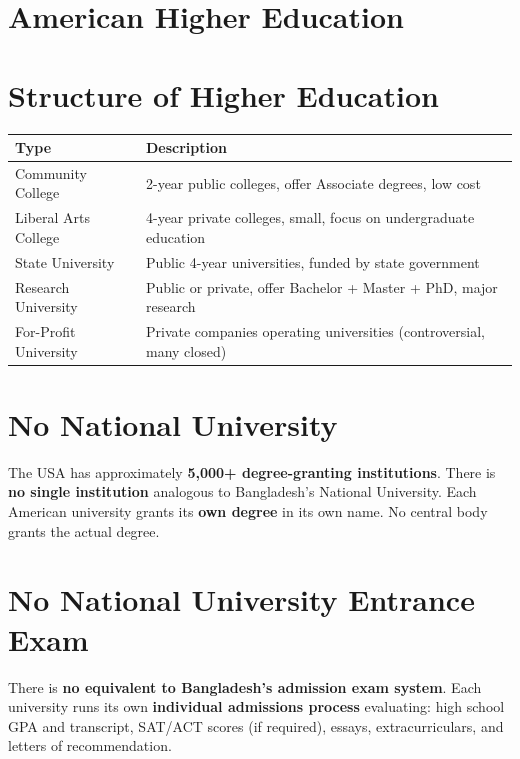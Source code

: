 \section{American Higher Education}

\section{Structure of Higher Education}


\begin{center}\small
	\begin{tabularx}{0.97\textwidth}{@{} >{\raggedright\arraybackslash}p{3.5cm} X @{}}
		\toprule
		\textbf{Type}         & \textbf{Description}                                                  \\
		\midrule
		Community College     & 2-year public colleges, offer Associate degrees, low cost             \\
		Liberal Arts College  & 4-year private colleges, small, focus on undergraduate education      \\
		State University      & Public 4-year universities, funded by state government                \\
		Research University   & Public or private, offer Bachelor + Master + PhD, major research      \\
		For-Profit University & Private companies operating universities (controversial, many closed) \\
		\bottomrule
	\end{tabularx}
\end{center}


\section{No National University}

The USA has approximately \textbf{5,000+ degree-granting institutions}. There is \textbf{no single institution} analogous to Bangladesh's National University. Each American university grants its \textbf{own degree} in its own name. No central body grants the actual degree.

\section{No National University Entrance Exam}

There is \textbf{no equivalent to Bangladesh's admission exam system}. Each university runs its own \textbf{individual admissions process} evaluating: high school GPA and transcript, SAT/ACT scores (if required), essays, extracurriculars, and letters of recommendation.


